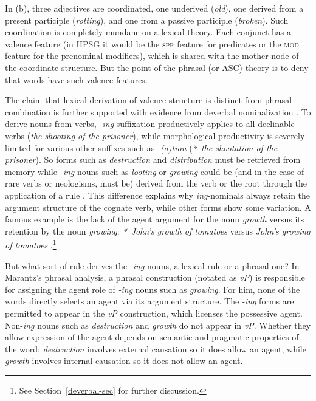 \noindent
In (b), three adjectives are coordinated, one underived (\emph{old}), one derived from a
present participle (\emph{rotting}), and one from a passive participle (\emph{broken}).  Such
coordination is completely mundane on a lexical theory.  Each \azero conjunct has a valence feature
(in HPSG it would be the \textsc{spr} feature for predicates or the \textsc{mod} feature for the prenominal
modifiers), which is shared with the mother node of the coordinate structure.  But the point of the
phrasal (or ASC) theory is to deny that words have such valence features.   

The claim that lexical derivation of valence structure is distinct from phrasal combination is
further supported with evidence from deverbal nominalization \citep{Wechsler2008a}.  To derive nouns
from verbs, \emph{-ing} suffixation productively applies to all declinable verbs (\emph{the shooting
  of the prisoner}), while morphological productivity is severely limited for various other suffixes
such as \emph{-(a)tion} (\emph{*~the shootation of the prisoner}).  So forms such as \emph{destruction}
and \emph{distribution} must be retrieved from memory while \emph{-ing} nouns such as \emph{looting} or
\emph{growing} could be (and in the case of rare verbs or neologisms, must be) derived from the verb
or the root through the application of a rule \citep{Zucchi93a-u}.  
This difference explains why
\emph{ing}-nominals always retain the argument structure of the cognate verb, while other forms show
some variation.  A famous example is the lack of the agent argument for the noun \emph{growth} versus
its retention by the noun \emph{growing}: \emph{*~John's growth of tomatoes} versus \emph{John's growing
  of tomatoes} \citep{Chomsky70a}.\footnote{See Section~\ref{deverbal-sec} for further discussion.} 
  
But what sort of rule derives the \emph{-ing} nouns, a lexical rule or a phrasal one?  
In Marantz's \citeyearpar{Marantz97a} phrasal analysis,  a phrasal
construction (notated as \emph{vP}) is responsible for assigning the agent role 
of  \emph{-ing} nouns such as \emph{growing}.  For him, none of the words directly selects an agent via its argument structure.
The \emph{-ing} forms are
permitted to appear in the \emph{vP} construction, which licenses the possessive agent.  
Non-\emph{ing} nouns such as \emph{destruction} and  \emph{growth} do not appear in \emph{vP}.  Whether they allow
expression of the agent depends on semantic and pragmatic properties of the word: \emph{destruction} involves external 
causation so it does allow an agent, while \emph{growth} involves internal causation so it does not allow an agent.

